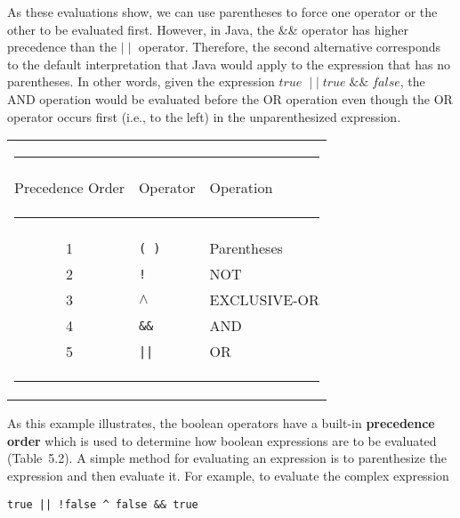\noindent As these evaluations show, we can use parentheses to
force one operator or the other to be evaluated first.  However, in
Java, the \&\& \mbox{operator} has higher precedence
than the $\mid\mid$ operator.  Therefore, the second alternative
corresponds to the default interpretation that Java would apply to the
expression that has no parentheses.  In other words, given the
expression $true \; \mid\mid \; true \; \&\& \; false$, the AND
operation would be evaluated before the OR operation even though the
OR operator occurs first (i.e., to the left) in the unparenthesized
expression.

\begin{table}[htb]
\hspace*{3.5pc}\begin{tabular}{cll} 
\multicolumn{3}{l}{\color{cyan}\rule{19pc}{1pt}}\\[2pt]
{Precedence Order}\hspace*{12pt}&{Operator}\hspace*{12pt}&{Operation}
\\[-4pt]\multicolumn{3}{l}{\color{cyan}\rule{19pc}{0.5pt}}\\[2pt]
1&{\tt (  )}&Parentheses\\
2&{\tt !}&NOT\\
3&{\tt $\wedge$}&EXCLUSIVE-OR\\
4&{\tt \&\&}&AND\\
5&{\tt ||}&OR
\\[-4pt]\multicolumn{3}{l}{\color{cyan}\rule{19pc}{1pt}}
\end{tabular}
\endTB
\end{table}

As this example illustrates, the boolean operators have a built-in
{\bf precedence order} which is used to determine how boolean
expressions are to be evaluated (Table~5.2).  A simple method for
evaluating an expression is to parenthesize the expression and then
evaluate it.  For example, to evaluate the complex expression

\begin{jjjlisting}
\begin{lstlisting}
true || !false ^ false && true
\end{lstlisting}
\end{jjjlisting}

